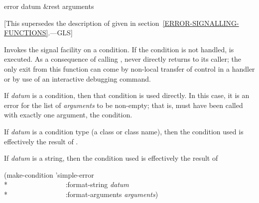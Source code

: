 \begin{defun}[Function]
error datum &rest arguments

   [This supersedes the description of 
   given in section~\ref{ERROR-SIGNALLING-FUNCTIONS}.---GLS]

  Invokes the signal facility on a condition. If the condition is not handled,
   is executed. As a consequence of calling 
  ,  never directly returns to its caller; the only exit from this
  function can come by non-local transfer of control in a handler or by use of
  an interactive debugging command.

  If {\it datum} is a condition, then that condition is used directly. 
  In this case, it is an error for the list of {\it arguments} to be non-empty;
  that is,  must have been called with exactly one argument, the condition.

  If {\it datum} is a condition type (a class or class name), then the condition used is effectively the result
  of .

  If {\it datum} is a string, then the condition used is effectively the result of
\begin{lisp}
(make-condition 'simple-error \\*
~~~~~~~~~~~~~~~~:format-string {\it datum} \\*
~~~~~~~~~~~~~~~~:format-arguments {\it arguments})
\end{lisp}
\end{defun}

